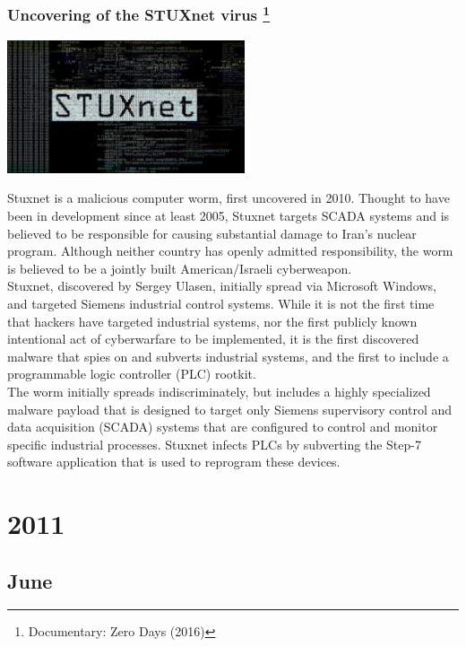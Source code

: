 \documentclass[11pt]{report}
\begin{document}
\subsection{Uncovering of the STUXnet virus \protect\footnote{Documentary: Zero Days (2016)}}
\vspace{2mm}\begin{center}\includegraphics[width=7cm]{./img/stuxnet.jpg}\end{center}
Stuxnet is a malicious computer worm, first uncovered in 2010. Thought to have been in development since at least 2005, Stuxnet targets SCADA systems and is believed to be responsible for causing substantial damage to Iran's nuclear program. Although neither country has openly admitted responsibility, the worm is believed to be a jointly built American/Israeli cyberweapon.\\
\indent Stuxnet, discovered by Sergey Ulasen, initially spread via Microsoft Windows, and targeted Siemens industrial control systems. While it is not the first time that hackers have targeted industrial systems, nor the first publicly known intentional act of cyberwarfare to be implemented, it is the first discovered malware that spies on and subverts industrial systems, and the first to include a programmable logic controller (PLC) rootkit.\\
\indent The worm initially spreads indiscriminately, but includes a highly specialized malware payload that is designed to target only Siemens supervisory control and data acquisition (SCADA) systems that are configured to control and monitor specific industrial processes. Stuxnet infects PLCs by subverting the Step-7 software application that is used to reprogram these devices.

\chapter{2011}
\section{June}
\end{document}
